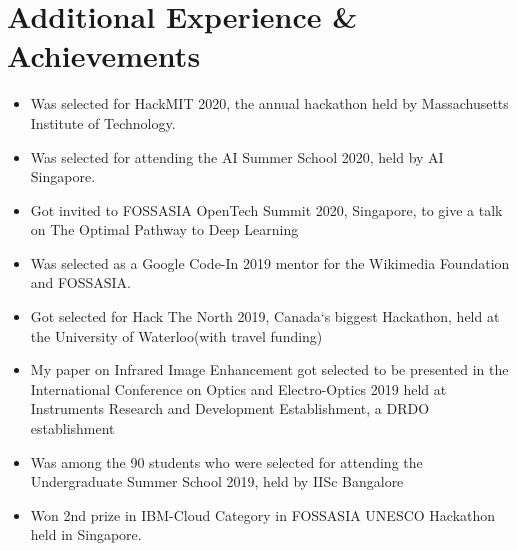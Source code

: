 \documentclass[letterpaper,11pt]{article}
\newcommand{\resumeSubHeadingListStart}{\begin{itemize}[leftmargin=*]}
\newcommand{\resumeSubHeadingListEnd}{\end{itemize}}
\newcommand{\shorterSection}[1]{\vspace{-12pt}\section{#1}}
\begin{document}
\shorterSection{Additional Experience \& Achievements}
  \resumeSubHeadingListStart
  \small
  \item{Was selected for HackMIT 2020, the annual hackathon held by Massachusetts Institute of Technology.}
    \vspace{-6pt}
  \item{Was selected for attending the AI Summer School 2020, held by AI Singapore.}
    \vspace{-6pt}
    \item{Got invited to FOSSASIA OpenTech Summit 2020, Singapore, to give a talk on The Optimal Pathway to Deep Learning}
    \vspace{-6pt}
    \item{Was selected as a Google Code-In 2019 mentor for the Wikimedia Foundation and FOSSASIA.}
    \vspace{-6pt}
    \item{Got selected for Hack The North 2019, Canada`s biggest Hackathon, held at the University of Waterloo(with travel funding)}
    \vspace{-6pt}
    \item{My paper on Infrared Image Enhancement got selected to be presented in the International Conference on Optics and Electro-Optics 2019 held at Instruments Research and Development Establishment, a DRDO establishment}
    \vspace{-6pt}
    \item{Was among the 90 students who were selected for attending the Undergraduate Summer School 2019, held by IISc Bangalore}
    \vspace{-6pt}
    \item{Won 2nd prize in IBM-Cloud Category in FOSSASIA UNESCO Hackathon held in Singapore.}
  \resumeSubHeadingListEnd
\end{document}
